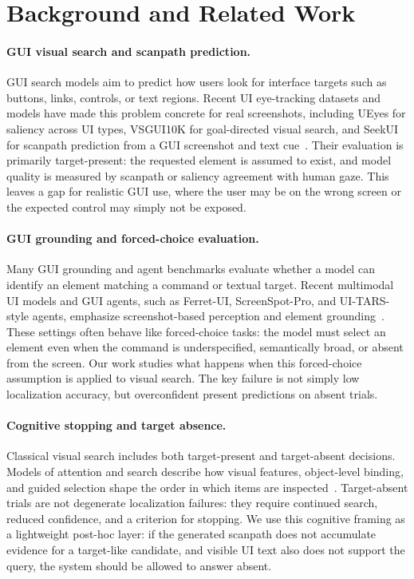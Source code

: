 \section{Background and Related Work}

\paragraph{GUI visual search and scanpath prediction.}
GUI search models aim to predict how users look for interface targets such as buttons, links, controls, or text regions. Recent UI eye-tracking datasets and models have made this problem concrete for real screenshots, including UEyes for saliency across UI types, VSGUI10K for goal-directed visual search, and SeekUI for scanpath prediction from a GUI screenshot and text cue~\cite{jiang2023ueyes,putkonen2025vsgui,guo2026seekui}. Their evaluation is primarily target-present: the requested element is assumed to exist, and model quality is measured by scanpath or saliency agreement with human gaze. This leaves a gap for realistic GUI use, where the user may be on the wrong screen or the expected control may simply not be exposed.

\paragraph{GUI grounding and forced-choice evaluation.}
Many GUI grounding and agent benchmarks evaluate whether a model can identify an element matching a command or textual target. Recent multimodal UI models and GUI agents, such as Ferret-UI, ScreenSpot-Pro, and UI-TARS-style agents, emphasize screenshot-based perception and element grounding~\cite{you2024ferretui,li2025screenspotpro,wang2025uitars}. These settings often behave like forced-choice tasks: the model must select an element even when the command is underspecified, semantically broad, or absent from the screen. Our work studies what happens when this forced-choice assumption is applied to visual search. The key failure is not simply low localization accuracy, but overconfident present predictions on absent trials.

\paragraph{Cognitive stopping and target absence.}
Classical visual search includes both target-present and target-absent decisions. Models of attention and search describe how visual features, object-level binding, and guided selection shape the order in which items are inspected~\cite{treisman1980feature,wolfe2021guided}. Target-absent trials are not degenerate localization failures: they require continued search, reduced confidence, and a criterion for stopping. We use this cognitive framing as a lightweight post-hoc layer: if the generated scanpath does not accumulate evidence for a target-like candidate, and visible UI text also does not support the query, the system should be allowed to answer absent.

